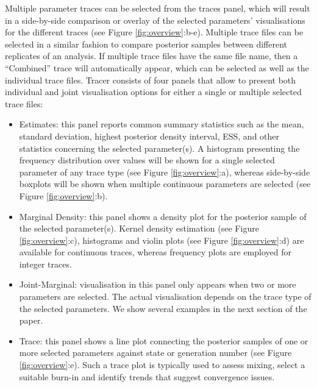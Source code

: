 \documentclass{bioinfo}
\begin{document}
Multiple parameter traces can be selected from the traces panel, which will result in a side-by-side comparison or overlay of the selected parameters' visualisations for the different traces (see Figure \ref{fig:overview}:b-e).
Multiple trace files can be selected in a similar fashion to compare posterior samples between different replicates of an analysis.
If multiple trace files have the same file name,  then a ``Combined'' trace will automatically appear, which can be selected as well as the individual trace files.
Tracer consists of four panels that allow to present both individual and joint visualisation options for either a single or multiple selected trace files:

\begin{itemize}

\item Estimates: this panel reports common summary statistics such as the mean, standard deviation, highest posterior density interval, ESS, and other statistics concerning the selected parameter(s).
A histogram presenting the frequency distribution over values will be shown for a single selected parameter of any trace type (see Figure \ref{fig:overview}:a), whereas side-by-side boxplots will be shown when multiple continuous parameters are selected (see Figure \ref{fig:overview}:b).

\item Marginal Density: this panel shows a density plot for the posterior sample of the selected parameter(s). Kernel density estimation (see Figure \ref{fig:overview}:c), histograms and violin plots (see Figure \ref{fig:overview}:d) are available for continuous traces, whereas frequency plots are employed for integer traces.

\item Joint-Marginal: visualisation in this panel only appears when two or more parameters are selected. The actual visualisation depends on the trace type of the selected parameters. We show several examples in the next section of the paper.

\item Trace: this panel shows a line plot connecting the posterior samples of one or more selected parameters against state or generation number (see Figure \ref{fig:overview}:e). Such a trace plot is typically used to assess mixing, select a suitable burn-in and identify trends that suggest convergence issues.

\end{itemize}
\end{document}
